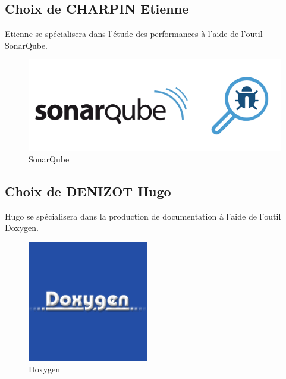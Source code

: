 \documentclass[12pt,french]{article} %
\begin{document}
\subsection{Choix de CHARPIN Etienne}

Etienne se spécialisera dans l'étude des performances à l'aide de l'outil SonarQube.

\begin{figure}[H]
	\centering
	\includegraphics[scale=0.35]{cetienne.png}
	\caption{SonarQube}    
\end{figure}


\subsection{Choix de DENIZOT Hugo}

Hugo se spécialisera dans la production de documentation à l'aide de l'outil Doxygen.

\begin{figure}[H]
	\centering
	\includegraphics[scale=0.35]{chugo.png}
	\caption{Doxygen}    
\end{figure}


\bigskip


\listoffigures
\end{document}
